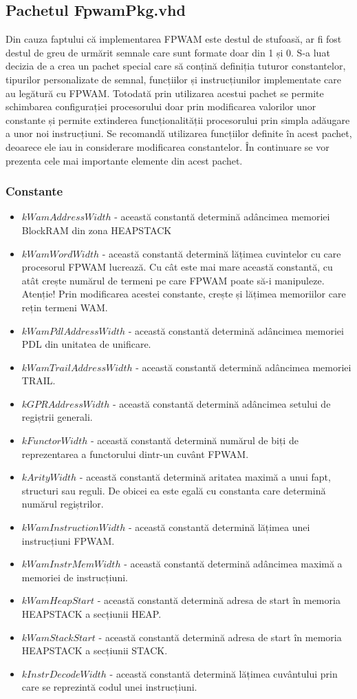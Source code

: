 \documentclass[12pt,a4paper,twoside]{report}
\begin{document}
\subsection{Pachetul FpwamPkg.vhd}
Din cauza faptului că implementarea FPWAM este destul de stufoasă, ar fi fost destul de greu de urmărit semnale care sunt formate doar din 1 și 0. S-a luat decizia de a crea un pachet special care să conțină definiția tuturor constantelor, tipurilor personalizate de semnal, funcțiilor și instrucțiunilor implementate care au legătură cu FPWAM. Totodată prin utilizarea acestui pachet se permite schimbarea configurației procesorului doar prin modificarea valorilor unor constante și permite extinderea funcționalității procesorului prin simpla adăugare a unor noi instrucțiuni. Se recomandă utilizarea funcțiilor definite în acest pachet, deoarece ele iau in considerare modificarea constantelor. În continuare se vor prezenta cele mai importante elemente din acest pachet.
\subsubsection{Constante}
\begin{itemize}
\item $kWamAddressWidth$ - această constantă determină adâncimea memoriei BlockRAM din zona HEAPSTACK
\item $kWamWordWidth$ - această constantă determină lățimea cuvintelor cu care procesorul FPWAM lucrează. Cu cât este mai mare această constantă, cu atât crește numărul de termeni pe care FPWAM poate să-i manipuleze. Atenție! Prin modificarea acestei constante, crește și lățimea memoriilor care rețin termeni WAM.
\item $kWamPdlAddressWidth$ - această constantă determină adâncimea memoriei PDL din unitatea de unificare.
  \item $kWamTrailAddressWidth$ - această constantă determină adâncimea memoriei TRAIL.
  \item $kGPRAddressWidth$ - această constantă determină adâncimea setului de regiștrii generali.
  \item $kFunctorWidth$ - această constantă determină numărul de biți de reprezentarea a functorului dintr-un cuvânt FPWAM.
  \item $kArityWidth$ - această constantă determină aritatea maximă a unui fapt, structuri sau reguli. De obicei ea este egală cu constanta care determină numărul regiștrilor.
  \item $kWamInstructionWidth$ - această constantă determină lățimea unei instrucțiuni FPWAM.
  \item $kWamInstrMemWidth$  - această constantă determină adâncimea maximă a memoriei de instrucțiuni.
  \item $kWamHeapStart$ - această constantă determină adresa de start în memoria HEAPSTACK a secțiunii HEAP.
  \item $kWamStackStart$ - această constantă determină adresa de start în memoria HEAPSTACK a secțiunii STACK.
  \item $kInstrDecodeWidth$ - această constantă determină lățimea cuvântului prin care se reprezintă codul unei instrucțiuni.
\end{itemize}
\end{document}

